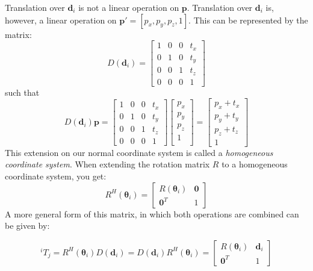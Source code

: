 Translation over $\mathbf{d}_i$ is not a linear operation on $\mathbf{p}$.
Translation over $\mathbf{d}_i$ is, however, a linear operation on $\mathbf{p}' =
\left[p_x, p_y, p_z, 1\right]$.  This can be represented by the matrix:
\begin{equation*}
D(\mathbf{d}_i) = 
\begin{bmatrix}
1 & 0 & 0 & t_x \\
0 & 1 & 0 & t_y \\
0 & 0 & 1 & t_z \\
0 & 0 & 0 & 1
\end{bmatrix}
\end{equation*}
such that 
\begin{equation*}
D(\mathbf{d}_i) \mathbf{p}
=
\begin{bmatrix}
1 & 0 & 0 & t_x \\
0 & 1 & 0 & t_y \\
0 & 0 & 1 & t_z \\
0 & 0 & 0 & 1
\end{bmatrix}
\begin{bmatrix}
p_x\\
p_y\\
p_z\\
1\\
\end{bmatrix}
= 
\begin{bmatrix}
p_x + t_x\\
p_y + t_y\\
p_z + t_z\\
1
\end{bmatrix}
\end{equation*}
This extension on our normal coordinate system is called a \emph{homogeneous
coordinate system}.  When extending the
rotation matrix $R$ to a homogeneous coordinate system,
you get:
\begin{equation*}
R^H(\mathbf{\theta}_i) = 
\begin{bmatrix}
R(\mathbf{\theta}_i) & \mathbf{0} \\
\mathbf{0}^T & 1
\end{bmatrix}
\end{equation*}
A more general form of this matrix, in which both operations are combined can
be given by:

\begin{equation*}
^iT_j = R^H(\mathbf{\theta}_i)D(\mathbf{d}_i) = D(\mathbf{d}_i)R^H(\mathbf{\theta}_i) =
\begin{bmatrix}
R(\mathbf{\theta}_i) & \mathbf{d}_i \\
\mathbf{0}^T & 1
\end{bmatrix}
\end{equation*}

